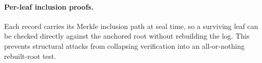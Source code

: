 \paragraph{Per-leaf inclusion proofs.}
Each record carries its Merkle inclusion path at seal time, so a surviving
leaf can be checked directly against the anchored root without rebuilding
the log. This prevents structural attacks from collapsing verification
into an all-or-nothing rebuilt-root test.
